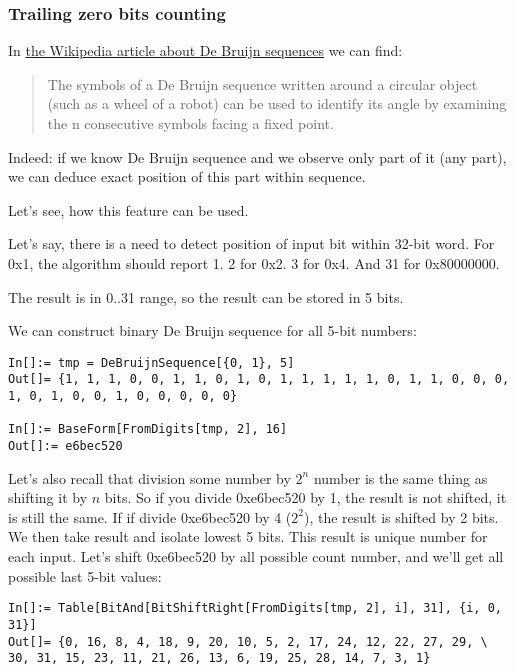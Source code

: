 \subsubsection{Trailing zero bits counting}

In \href{https://en.wikipedia.org/wiki/De_Bruijn_sequence}{the Wikipedia article about De Bruijn sequences} we can find:

\begin{framed}
\begin{quotation}
The symbols of a De Bruijn sequence written around a circular object (such as a wheel of a robot) can be used to identify its angle by examining the n consecutive symbols facing a fixed point.
\end{quotation}
\end{framed}

Indeed: if we know De Bruijn sequence and we observe only part of it (any part), we can deduce exact position of this part within sequence.

Let's see, how this feature can be used.

Let's say, there is a need to detect position of input bit within 32-bit word.
For 0x1, the algorithm should report 1.
2 for 0x2.
3 for 0x4.
And 31 for 0x80000000.

The result is in 0..31 range, so the result can be stored in 5 bits.

We can construct binary De Bruijn sequence for all 5-bit numbers:

\begin{lstlisting}
In[]:= tmp = DeBruijnSequence[{0, 1}, 5]
Out[]= {1, 1, 1, 0, 0, 1, 1, 0, 1, 0, 1, 1, 1, 1, 1, 0, 1, 1, 0, 0, 0, 1, 0, 1, 0, 0, 1, 0, 0, 0, 0, 0}

In[]:= BaseForm[FromDigits[tmp, 2], 16]
Out[]:= e6bec520
\end{lstlisting}

Let's also recall that division some number by $2^n$ number is the same thing as shifting it by $n$ bits.
So if you divide 0xe6bec520 by 1, the result is not shifted, it is still the same.
If if divide 0xe6bec520 by 4 ($2^2$), the result is shifted by 2 bits.
We then take result and isolate lowest 5 bits.
This result is unique number for each input.
Let's shift 0xe6bec520 by all possible count number, and we'll get all possible last 5-bit values:

\begin{lstlisting}
In[]:= Table[BitAnd[BitShiftRight[FromDigits[tmp, 2], i], 31], {i, 0, 31}]
Out[]= {0, 16, 8, 4, 18, 9, 20, 10, 5, 2, 17, 24, 12, 22, 27, 29, \
30, 31, 15, 23, 11, 21, 26, 13, 6, 19, 25, 28, 14, 7, 3, 1}
\end{lstlisting}

